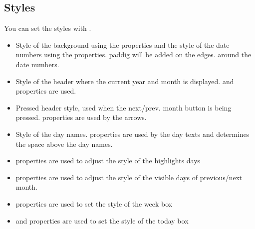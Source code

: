 \documentclass[letterpaper,10pt,english]{sphinxmanual}
\begin{document}
\subsection{Styles}
\label{\detokenize{object-types/calendar:styles}}
You can set the styles with .
\begin{itemize}
\item {} 
 Style of the background using the  properties and the style of the date numbers using the  properties.  paddig will be added on the edges. around the date numbers.

\item {} 
 Style of the header where the current year and month is displayed.  and  properties are used.

\item {} 
 Pressed header style, used when the next/prev. month button is being pressed.  properties are used by the arrows.

\item {} 
 Style of the day names.  properties are used by the day texts and  determines the space above the day names.

\item {} 
  properties are used to adjust the style of the highlights days

\item {} 
  properties are used to adjust the style of the visible days of previous/next month.

\item {} 
  properties are used to set the style of the week box

\item {} 
  and  properties are used to set the style of the today box

\end{itemize}
\end{document}
